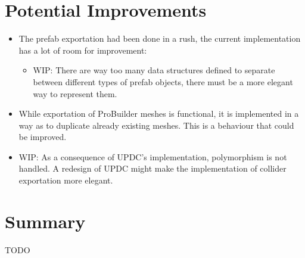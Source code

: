 \documentclass[12pt,a4paper]{article}
\begin{document}
\section{Potential Improvements}
\begin{itemize}
\item The prefab exportation had been done in a rush, the current implementation has a lot of room for improvement:
\begin{itemize}
\item WIP: There are way too many data structures defined to separate between different types of prefab objects, there must be a more elegant way to represent them.
\end{itemize}
\item While exportation of ProBuilder meshes is functional, it is implemented in a way as to duplicate already existing meshes. This is a behaviour that could be improved.
\item WIP: As a consequence of UPDC's implementation, polymorphism is not handled. A redesign of UPDC might make the implementation of collider exportation more elegant.
\end{itemize}

\section{Summary}
TODO
\end{document}
